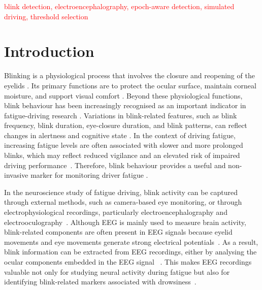 \documentclass[journal,twoside,web]{ieeecolor}
\newcommand{\rev}[1]{\textcolor{red}{#1}}
\begin{document}
\begin{IEEEkeywords}
%
\rev{blink detection, electroencephalography, epoch-aware detection, simulated
driving, threshold selection}
\end{IEEEkeywords}

%
%
%
\section{Introduction}

%
Blinking is a physiological process that involves the closure and reopening of the eyelids \citep{nystrm2024what}. Its primary functions are to protect the ocular surface, maintain corneal moisture, and support visual comfort \citep{nystrm2024what}. Beyond these physiological functions, blink behaviour has been increasingly recognised as an important indicator in fatigue-driving research \citep{alyan2023blink,tian2021fatigue}. Variations in blink-related features, such as blink frequency, blink duration, eye-closure duration, and blink patterns, can reflect changes in alertness and cognitive state \citep{alyan2023blink,ren2019comparison}.
In the context of driving fatigue, increasing fatigue levels are often associated with slower and more prolonged blinks, which may reflect reduced vigilance and an elevated risk of impaired driving performance~\citep{alyan2023blink}.
Therefore, blink behaviour provides a useful and non-invasive marker for monitoring driver fatigue \citep{shahbakhti2023fusion,tian2021fatigue}.
 
%
In the neuroscience study of fatigue driving, blink activity can be captured through external methods, such as camera-based eye monitoring, or through electrophysiological recordings, particularly electroencephalography and electrooculography~\citep{tian2021fatigue,shahbakhti2023fusion}. Although EEG is mainly used to measure brain activity, blink-related components are often present in EEG signals because eyelid movements and eye movements generate strong electrical potentials~\citep{croft2000removal,akuthota2023artifacts}.
%
As a result, blink information can be extracted from EEG recordings, either by analysing the ocular components embedded in the EEG signal ~\citep{agarwal2019blink,shahbakhti2023fusion}.
This makes EEG recordings valuable not only for studying neural activity during fatigue but also for identifying blink-related markers associated with drowsiness~\citep{ko2020eyeblink,alyan2023blink}.
 
\end{document}
